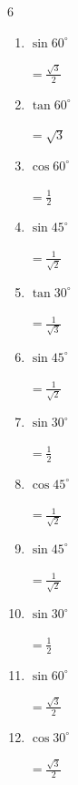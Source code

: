 \begin{multicols}{6}
\begin{enumerate}
        $\displaystyle =\frac{1}{2}$

  \item $\displaystyle \sin{60^\circ}$

        $\displaystyle =\frac{\sqrt{3}}{2}$

  \item $\displaystyle \tan{60^\circ}$

        $\displaystyle =\sqrt{3}$

  \item $\displaystyle \cos{60^\circ}$

        $\displaystyle =\frac{1}{2}$

  \item $\displaystyle \sin{45^\circ}$

        $\displaystyle =\frac{1}{\sqrt{2}}$

  \item $\displaystyle \tan{30^\circ}$

        $\displaystyle =\frac{1}{\sqrt{3}}$

  \item $\displaystyle \sin{45^\circ}$

        $\displaystyle =\frac{1}{\sqrt{2}}$

\columnbreak %

\resetques

  \item $\displaystyle \sin{30^\circ}$

        $\displaystyle =\frac{1}{2}$

  \item $\displaystyle \cos{45^\circ}$

        $\displaystyle =\frac{1}{\sqrt{2}}$

  \item $\displaystyle \sin{45^\circ}$

        $\displaystyle =\frac{1}{\sqrt{2}}$

  \item $\displaystyle \sin{30^\circ}$

        $\displaystyle =\frac{1}{2}$

  \item $\displaystyle \sin{60^\circ}$

        $\displaystyle =\frac{\sqrt{3}}{2}$

  \item $\displaystyle \cos{30^\circ}$

        $\displaystyle =\frac{\sqrt{3}}{2}$


\end{enumerate}
\end{multicols}
